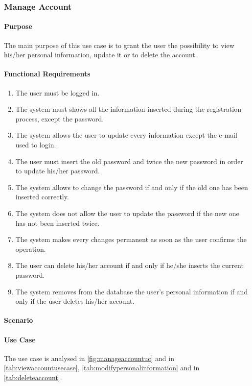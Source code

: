 \clearpage
\subsubsection{Manage Account}

\paragraph*{Purpose}
The main purpose of this use case is to grant the user the possibility to view his/her personal information, update it or to delete the account.

\paragraph*{Functional Requirements}
\begin{enumerate}[label=R.\arabic*:, resume]
	\item The user must be logged in.
	\item The system must shows all the information inserted during the registration process, except the password.
	\item {\label{req:startmanage}} The system allows the user to update every information except the e-mail used to login.
	\item The user must insert the old password and twice the new password in order to update his/her password.
	\item The system allows to change the password if and only if the old one has been inserted correctly.
	\item {\label{req:endmanage}}The system does not allow the user to update the password if the new one has not been inserted twice.
	\item The system makes every changes permanent as soon as the user confirms the operation.
	\item The user can delete his/her account if and only if he/she inserts the current password.
	\item The system removes from the database the user's personal information if and only if the user deletes his/her account.
\end{enumerate}

\paragraph*{Scenario}

\paragraph*{Use Case}
The use case is analysed in \autoref{fig:manageaccountuc} and in \autoref{tab:viewaccountusecase}, \autoref{tab:modifypersonalinformation} and in \autoref{tab:deleteaccount}.

